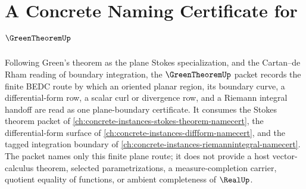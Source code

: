 \chapter{A Concrete Naming Certificate for $\GreenTheoremUp$}
\label{ch:concrete-instances-green-theorem-namecert}

Following Green's theorem as the plane Stokes specialization, and the Cartan--de Rham reading of boundary integration, the $\GreenTheoremUp$ packet records the finite BEDC route by which an oriented planar region, its boundary curve, a differential-form row, a scalar curl or divergence row, and a Riemann integral handoff are read as one plane-boundary certificate. It consumes the Stokes theorem packet of \autoref{ch:concrete-instances-stokes-theorem-namecert}, the differential-form surface of \autoref{ch:concrete-instances-diffform-namecert}, and the tagged integration boundary of \autoref{ch:concrete-instances-riemannintegral-namecert}. The packet names only this finite plane route; it does not provide a host vector-calculus theorem, selected parametrizations, a measure-completion carrier, quotient equality of functions, or ambient completeness of $\RealUp$.

